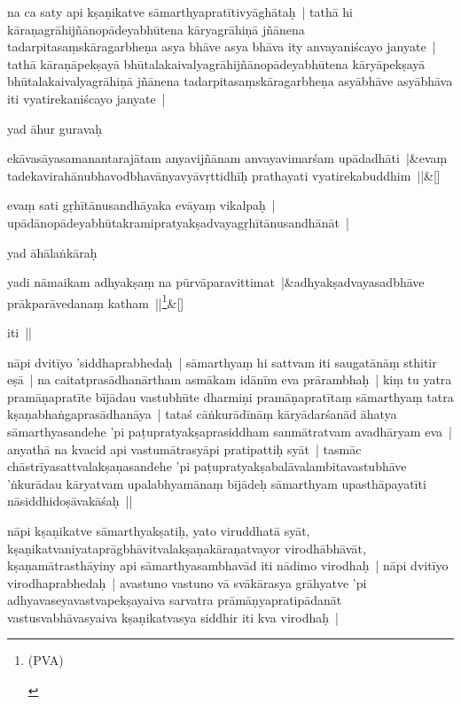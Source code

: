 \documentclass[article,12pt,a4paper]{memoir}
\begin{document}
	  \pstart na ca saty api kṣaṇikatve sāmarthyapratītivyāghātaḥ | tathā hi kāraṇagrāhijñānopādeyabhūtena kāryagrāhiṇā jñānena tadarpitasaṃskāragarbheṇa asya bhāve asya bhāva ity anvayaniścayo janyate | tathā kāraṇāpekṣayā bhūtalakaivalyagrāhijñānopādeyabhūtena kāryāpekṣayā bhūtalakaivalyagrāhiṇā jñānena tadarpitasaṃskāragarbheṇa asyābhāve asyābhāva iti vyatirekaniścayo janyate | 
	\pend
      

	  \pstart yad āhur guravaḥ 
	\pend
      
	    
	    \stanza[\smallbreak]
	ekāvasāyasamanantarajātam anyavijñānam anvayavimarśam upādadhāti |&evaṃ tadekavirahānubhavodbhavānyavyāvṛttidhīḥ prathayati vyatirekabuddhim ||\&[\smallbreak]


	

	  \pstart evaṃ sati gṛhītānusandhāyaka evāyaṃ vikalpaḥ | upādānopādeyabhūtakramipratyakṣadvayagṛhītānusandhānāt | 
	\pend
      

	  \pstart yad āhālaṅkāraḥ 
	\pend
      
	    
	    \stanza[\smallbreak]
	yadi nāmaikam adhyakṣaṃ na pūrvāparavittimat |&adhyakṣadvayasadbhāve prākparāvedanaṃ katham ||\footnote{\begin{english}(PVA)\end{english}}\&[\smallbreak]


	

	  \pstart iti ||
	\pend
      

	  \pstart nāpi dvitīyo 'siddhaprabhedaḥ | sāmarthyaṃ hi sattvam iti saugatānāṃ sthitir eṣā | na caitatprasādhanārtham asmākam idānīm eva prārambhaḥ | kiṃ tu yatra pramāṇapratīte bījādau vastubhūte dharmiṇi pramāṇapratītaṃ sāmarthyaṃ tatra kṣaṇabhaṅgaprasādhanāya | \label{thakur75-72.26} tataś cāṅkurādīnāṃ kāryādarśanād āhatya sāmarthyasandehe 'pi paṭupratyakṣaprasiddham sanmātratvam avadhāryam eva | anyathā na kvacid api vastumātrasyāpi pratipattiḥ syāt | \label{thakur75-72.29} tasmāc chāstrīyasattvalakṣaṇasandehe 'pi paṭupratyakṣabalāvalambitavastubhāve 'ṅkurādau kāryatvam upalabhyamānaṃ bījādeḥ sāmarthyam upasthāpayatīti nāsiddhidoṣāvakāśaḥ ||
	\pend
      

	  \pstart nāpi kṣaṇikatve sāmarthyakṣatiḥ, yato viruddhatā syāt, kṣaṇikatvaniyataprāgbhāvitvalakṣaṇakāraṇatvayor virodhābhāvāt, kṣaṇamātrasthāyiny api sāmarthyasambhavād iti nādimo virodhaḥ | \label{thakur75-73.5} nāpi dvitīyo virodhaprabhedaḥ | avastuno vastuno vā svākārasya grāhyatve 'pi adhyavaseyavastvapekṣayaiva sarvatra prāmāṇyapratipādanāt vastusvabhāvasyaiva kṣaṇikatvasya siddhir iti kva virodhaḥ |
	\pend
      
\end{document}
